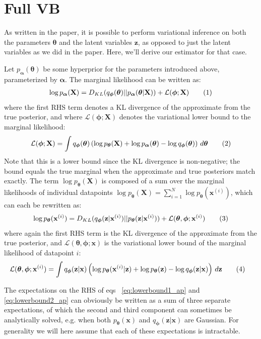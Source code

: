 \documentclass{article} %
\theoremstyle{definition}
\newcommand{\bb}[1]{\mathbf{#1}}
\newcommand{\bx}{\bb{x}}
\newcommand{\bxi}{\bx^{(i)}}
\newcommand{\bz}{\bb{z}}
\newcommand{\bT}{\boldsymbol{\theta}}
\newcommand{\balpha}{\boldsymbol{\alpha}}
\newcommand{\bphi}{\boldsymbol{\phi}}
\newcommand{\bX}{\bb{X}}
\newcommand{\pT}{p_{\bT}}
\newcommand{\pA}{p_{\balpha}}
\newcommand{\qPhi}{q_{\bphi}}
\newcommand{\eqnr}{\addtocounter{equation}{1}\tag{\theequation}}
\theoremstyle{definition}
\begin{document}
\section{Full VB}
As written in the paper, it is possible to perform variational inference on both the parameters $\bT$ and the latent variables $\bz$, as opposed to just the latent variables as we did in the paper. Here, we'll derive our estimator for that case.

Let $\pA(\bT)$  be some hyperprior for the parameters introduced above, parameterized by $\balpha$. The marginal likelihood can be written as:
\begin{align*}
\log \pA(\bX) = D_{KL}(\qPhi(\bT)||\pA(\bT|\bX)) + \mathcal{L}(\bphi;\bX)
\eqnr\end{align*}
where the first RHS term denotes a KL divergence of the approximate from the true posterior, and where $\mathcal{L}(\bphi;\bX)$ denotes the variational lower bound to the marginal likelihood:
\begin{align*}
\mathcal{L}(\bphi;\bX) = \int \qPhi(\bT) \left( \log \pT(\bX) + \log \pA(\bT) - \log \qPhi(\bT) \right) \,d\bT
\eqnr\label{eq:lowerbound1_ap}\end{align*}
Note that this is a lower bound since the KL divergence is non-negative; the bound equals the true marginal when the approximate and true posteriors match exactly.
The term $\log \pT(\bX)$ is composed of a sum over the marginal likelihoods of individual datapoints $\log \pT(\bX) = \sum_{i=1}^N \log \pT(\bxi)$, which can each be rewritten as:
\begin{align*}
\log \pT(\bxi) = D_{KL}(\qPhi(\bz|\bxi)||\pT(\bz|\bxi)) + \mathcal{L}(\bT,\bphi;\bxi)
\eqnr\end{align*}
where again the first RHS term is the KL divergence of the approximate from the true posterior, and $\mathcal{L}(\bT,\bphi;\bx)$ is the variational lower bound of the marginal likelihood of datapoint $i$:
\begin{align*}
\mathcal{L}(\bT,\bphi;\bxi)
&= \int \qPhi(\bz|\bx) \left(\log \pT(\bxi | \bz) + \log \pT(\bz) - \log \qPhi(\bz|\bx)\right) \,d\bz 
\eqnr\label{eq:lowerbound2_ap}\end{align*}

%
%
%
%

The expectations on the RHS of eqs ~\eqref{eq:lowerbound1_ap} and \eqref{eq:lowerbound2_ap} can obviously be written as a sum of three separate expectations, of which the second and third component can sometimes be analytically solved, e.g. when both $\pT(\bx)$ and $\qPhi(\bz|\bx)$ are Gaussian. For generality we will here assume that each of these expectations is intractable.
\end{document}
